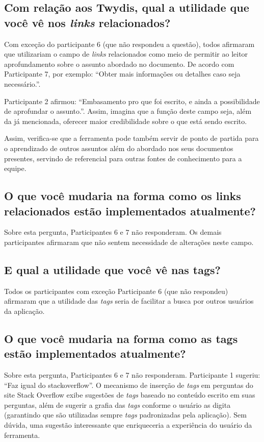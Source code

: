 \subsection{Com relação aos Twydis, qual a utilidade que você vê nos \textit{links} relacionados?}

Com exceção do participante 6 (que não respondeu a questão), todos afirmaram que utilizariam o campo de \textit{links} relacionados como meio de permitir ao leitor aprofundamento sobre o assunto abordado no documento. De acordo com Participante 7, por exemplo: ``Obter mais informações ou detalhes caso seja necessário.''.

Participante 2 afirmou: ``Embasamento pro que foi escrito, e ainda a possibilidade de aprofundar o assunto.''. Assim, imagina que a função deste campo seja, além da já mencionada, oferecer maior credibilidade sobre o que está sendo escrito.

Assim, verifica-se que a ferramenta pode também servir de ponto de partida para o aprendizado de outros assuntos além do abordado nos seus documentos presentes, servindo de referencial para outras fontes de conhecimento para a equipe.

\subsection{O que você mudaria na forma como os links relacionados estão implementados atualmente?}

Sobre esta pergunta, Participantes 6 e 7 não responderam. Os demais participantes afirmaram que não sentem necessidade de alterações neste campo.

\subsection{E qual a utilidade que você vê nas tags?}

Todos os participantes com exceção Participante 6 (que não respondeu) afirmaram que a utilidade das \textit{tags} seria de facilitar a busca por outros usuários da aplicação.

\subsection{O que você mudaria na forma como as tags estão implementados atualmente?}

Sobre esta pergunta, Participantes 6 e 7 não responderam. Participante 1 sugeriu: ``Faz igual do stackoverflow''. O mecanismo de inserção de \textit{tags} em perguntas do site Stack Overflow exibe sugestões de \textit{tags} baseado no conteúdo escrito em suas perguntas, além de sugerir a grafia das \textit{tags} conforme o usuário as digita (garantindo que são utilizadas sempre \textit{tags} padronizadas pela aplicação). Sem dúvida, uma sugestão interessante que enriqueceria a experiência do usuário da ferramenta.

